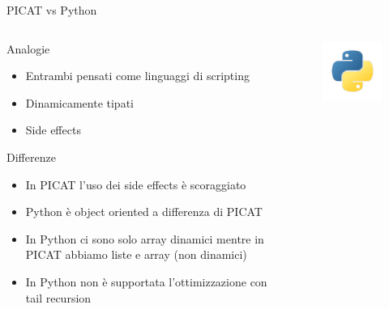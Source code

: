 \begin{frame}{PICAT vs Python}

	\begin{columns}

		\begin{column}{1\textwidth}

			Analogie
			\begin{itemize}
				\item Entrambi pensati come linguaggi di scripting
				\item Dinamicamente tipati
				\item Side effects
			\end{itemize}

			Differenze
			\begin{itemize}
				\item In PICAT l'uso dei side effects è scoraggiato
				\item Python è object oriented a differenza di PICAT
				\item In Python ci sono solo array dinamici mentre in PICAT abbiamo liste e array (non dinamici)
				\item In Python non è supportata l'ottimizzazione con tail recursion
			\end{itemize}

		\end{column}

		\begin{column}{0.1\textwidth}
			\begin{figure}
				\vspace*{-5cm}
				\hspace*{-2cm}
				\includegraphics[scale=0.5]{res/pythonLogo}
			\end{figure}
		\end{column}

	\end{columns}


\end{frame}